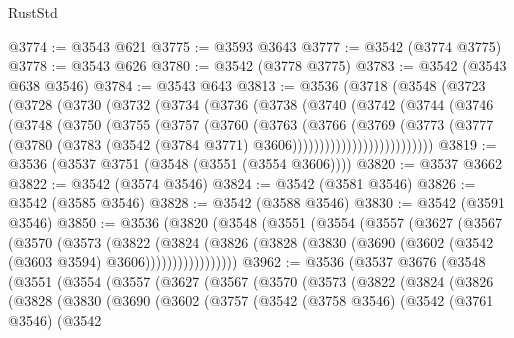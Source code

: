 \begin{lexlean}{RustStd}
\begin{coremodule}
@3774 := @3543 @621
@3775 := @3593 @3643
@3777 := @3542 (@3774 @3775)
@3778 := @3543 @626
@3780 := @3542 (@3778 @3775)
@3783 := @3542 (@3543 @638 @3546)
@3784 := @3543 @643
@3813 := @3536
    (@3718
      (@3548
        (@3723
          (@3728
            (@3730
              (@3732
                (@3734
                  (@3736
                    (@3738
                      (@3740
                        (@3742
                          (@3744
                            (@3746
                              (@3748
                                (@3750
                                  (@3755
                                    (@3757
                                      (@3760
                                        (@3763
                                          (@3766
                                            (@3769
                                              (@3773
                                                (@3777
                                                  (@3780
                                                    (@3783
                                                      (@3542
                                                        (@3784 @3771)
                                                        @3606))))))))))))))))))))))))))
@3819 := @3536 (@3537 @3751 (@3548 (@3551 (@3554 @3606))))
@3820 := @3537 @3662
@3822 := @3542 (@3574 @3546)
@3824 := @3542 (@3581 @3546)
@3826 := @3542 (@3585 @3546)
@3828 := @3542 (@3588 @3546)
@3830 := @3542 (@3591 @3546)
@3850 := @3536
    (@3820
      (@3548
        (@3551
          (@3554
            (@3557
              (@3627
                (@3567
                  (@3570
                    (@3573
                      (@3822
                        (@3824
                          (@3826
                            (@3828 (@3830 (@3690 (@3602 (@3542 (@3603 @3594) @3606)))))))))))))))))
@3962 := @3536
    (@3537
      @3676
      (@3548
        (@3551
          (@3554
            (@3557
              (@3627
                (@3567
                  (@3570
                    (@3573
                      (@3822
                        (@3824
                          (@3826
                            (@3828
                              (@3830
                                (@3690
                                  (@3602
                                    (@3757
                                      (@3542
                                        (@3758 @3546)
                                        (@3542
                                          (@3761 @3546)
                                          (@3542

\end{coremodule}
\end{lexlean}
